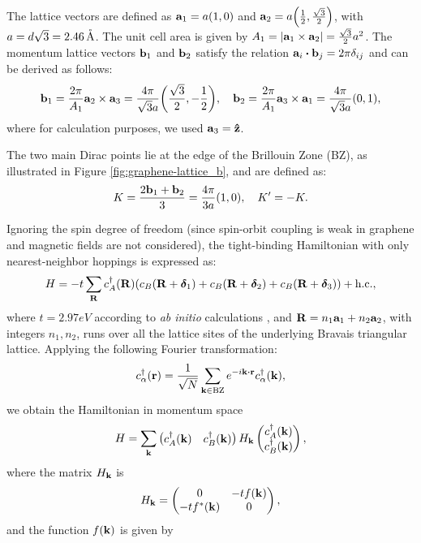 The lattice vectors are defined as \(\vb{a}_1 = a \qty(1, 0)\) and \(\vb{a}_2 = a \qty(\frac{1}{2}, \frac{\sqrt{3}}{2})\), with $a = d\sqrt{3} = 2.46 \, \AA$. The unit cell area is given by \( A_1 = \abs{\a_1 \times \a_2} = \frac{\sqrt{3}}{2} a^2 \). The momentum lattice vectors \(\b_1\) and \(\b_2\) satisfy the relation \(\a_i \vdot \b_j = 2\pi \delta_{ij}\) and can be derived as follows:
\begin{equation} \label{eq:monolayer-bvecs}
\b_1 = \frac{2\pi}{A_1} \a_2 \times \a_3 = \frac{4\pi}{\sqrt{3} a } \qty(\frac{\sqrt{3}}{2}, -\frac{1}{2}), \quad
\b_2 = \frac{2\pi}{A_1} \a_3 \times \a_1 = \frac{4\pi}{\sqrt{3} a } \qty(0, 1),
\end{equation}
where for calculation purposes, we used \(\a_3 = \vu{z}\).

The two main Dirac points lie at the edge of the Brillouin Zone (BZ), as illustrated in Figure \ref{fig:graphene-lattice_b}, and are defined as:
\begin{equation} \label{eq:monolayer-dirac-points}
K = \frac{2\b_1 + \b_2}{3} = \frac{4\pi}{3a} (1, 0) , \quad K' = -K.
\end{equation}

Ignoring the spin degree of freedom (since spin-orbit coupling is weak in graphene and magnetic fields are not considered), the tight-binding Hamiltonian with only nearest-neighbor hoppings is expressed as:
\begin{equation} \label{eq:monolayer-tight-binding}
H = -t \sum_{\R} c^\d_A(\R) \qty(c_B(\R + \vdelta_1) + c_B(\R+\vdelta_2) + c_B(\R+\vdelta_3)) + \hc,
\end{equation}
where $t = 2.97 \unit{eV}$ according to \textit{ab initio} calculations \cite{handbook2019}, and \(\R = n_1 \a_1 + n_2 \a_2\), with integers \(n_1, n_2\), runs over all the lattice sites of the underlying Bravais triangular lattice. Applying the following Fourier transformation:
\begin{equation} \label{eq:monolayer-fourier}
c_{\alpha}^\d(\r) = \frac{1}{\sqrt{N}} \sum_{\k \in \text{BZ}} e^{-i \k \vdot \r} c_\alpha^\d(\k),
\end{equation}
we obtain the Hamiltonian in momentum space
\begin{equation} \label{eq:monolayer-tight-binding2}
H = \sum_{\k}
\begin{pmatrix}
c_A^\d(\k) & c_B^\d(\k)
\end{pmatrix}
H_\k
\begin{pmatrix}
c_A^\d(\k) \\ c_B^\d(\k)
\end{pmatrix},
\end{equation}
where the matrix \(H_\k\) is
\begin{equation} \label{eq:hamiltonian_k_monolayer}
H_\k =
\begin{pmatrix}
0 & -t f(\k) \\
-t f^{*}(\k) & 0
\end{pmatrix},
\end{equation}
and the function \(f(\k)\) is given by


